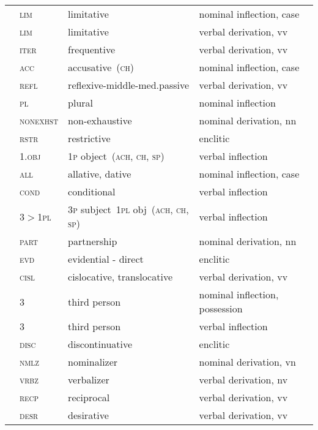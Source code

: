 \begin{refsection}
\begin{small}
\begin{longtable}{*{4}{@{\hspace{0.75ex}}l}@{\hspace{0ex}}}
 	& \textsc{lim} 	& limitative 	& nominal inflection, case\\
 	& \textsc{lim} 	& limitative 	& verbal derivation, vv\\
 		& \textsc{iter} 		& frequentive 	& verbal derivation, vv\\
 		& \textsc{acc} 	& accusative~(\textsc{ch}) 	& nominal inflection, case\\
 		& \textsc{refl} 		& reflexive-middle-med.passive 	& verbal derivation, vv\\
	& \textsc{pl} 	& plural 	& nominal inflection\\
	& \textsc{nonexhst} 	& non-exhaustive 	& nominal derivation, nn\\
 		& \textsc{rstr} 		& restrictive 	& enclitic\\
		& \textsc{1.obj} 	& 1\textsc{p} object~(\textsc{ach}, \textsc{ch}, \textsc{sp}) 	& verbal inflection \\
 	& \textsc{all} 		& allative, dative 	& nominal inflection, case\\
 	& \textsc{cond} 		& conditional 	& verbal inflection\\
 	& 3$>$1\textsc{pl}& 3\textsc{p} subject~1\textsc{pl} obj~(\textsc{ach}, \textsc{ch}, \textsc{sp}) & verbal inflection \\
 		& \textsc{part} 		& partnership 	& nominal derivation, nn\\
 		& \textsc{evd} 		& evidential - direct 	& enclitic\\
 		& \textsc{cisl} 		& cislocative, translocative 	& verbal derivation, vv\\
		& 3 	& third person 	& nominal inflection, possession\\
		& 3 	& third person 	& verbal inflection\\
 		& \textsc{disc} 		& discontinuative 	& enclitic\\
 	& \textsc{nmlz} 		& nominalizer 	& nominal derivation, vn\\
	& \textsc{vrbz} 		& verbalizer 	& verbal derivation, nv\\
 		& \textsc{recp} 		& reciprocal 	& verbal derivation, vv\\
 		& \textsc{desr} 		& desirative 	& verbal derivation, vv\\

\end{longtable}
\end{small}
\end{refsection}
